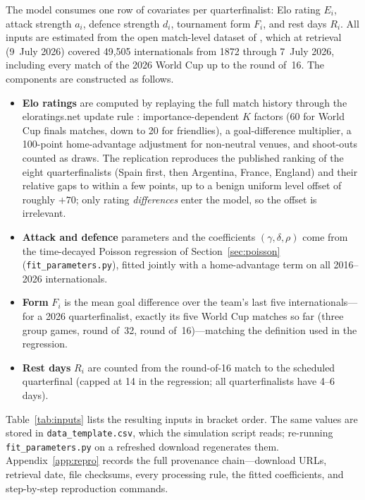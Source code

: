 \documentclass[11pt]{article}
\begin{document}
The model consumes one row of covariates per quarterfinalist:
Elo rating $E_i$, attack strength $a_i$, defence strength $d_i$, tournament
form $F_i$, and rest days $R_i$. All inputs are estimated from the open
match-level dataset of \cite{martj42results}, which at retrieval (9~July
2026) covered 49{,}505 internationals from 1872 through 7~July 2026,
including every match of the 2026 World Cup up to the round of~16. The
components are constructed as follows.
\begin{itemize}
  \item \textbf{Elo ratings} are computed by replaying the full match
        history through the eloratings.net update rule
        \cite{elo1978rating,eloratings}: importance-dependent $K$ factors
        (60 for World Cup finals matches, down to 20 for friendlies), a
        goal-difference multiplier, a 100-point home-advantage adjustment
        for non-neutral venues, and shoot-outs counted as draws. The
        replication reproduces the published ranking of the eight
        quarterfinalists (Spain first, then Argentina, France, England) and
        their relative gaps to within a few points, up to a benign uniform
        level offset of roughly $+70$; only rating \emph{differences} enter
        the model, so the offset is irrelevant.
  \item \textbf{Attack and defence} parameters and the coefficients
        $(\gamma, \delta, \rho)$ come from the time-decayed Poisson
        regression of Section~\ref{sec:poisson}
        (\texttt{fit\_parameters.py}), fitted jointly with a home-advantage
        term on all 2016--2026 internationals.
  \item \textbf{Form} $F_i$ is the mean goal difference over the team's last
        five internationals---for a 2026 quarterfinalist, exactly its five
        World Cup matches so far (three group games, round of~32, round
        of~16)---matching the definition used in the regression.
  \item \textbf{Rest days} $R_i$ are counted from the round-of-16 match to
        the scheduled quarterfinal (capped at 14 in the regression; all
        quarterfinalists have 4--6 days).
\end{itemize}
Table~\ref{tab:inputs} lists the resulting inputs in bracket order. The same
values are stored in \texttt{data\_template.csv}, which the simulation script
reads; re-running \texttt{fit\_parameters.py} on a refreshed download
regenerates them. Appendix~\ref{app:repro} records the full provenance
chain---download URLs, retrieval date, file checksums, every processing
rule, the fitted coefficients, and step-by-step reproduction commands.
\end{document}
